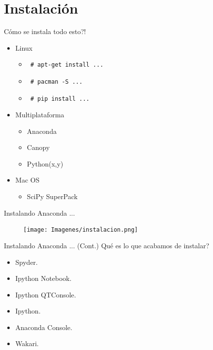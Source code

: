 \documentclass[bigger]{beamer}
\begin{document}
\section{Instalación}
\begin{frame}[fragile]{Cómo se instala todo esto?!}
    \begin{itemize}
        \item Linux
        \begin{itemize}
            \item \begin{verbatim} # apt-get install ... \end{verbatim}
            \item \begin{verbatim} # pacman -S ... \end{verbatim}
            \item \begin{verbatim} # pip install ...\end{verbatim}
        \end{itemize}
        \item Multiplataforma
        \begin{itemize}
            \item Anaconda
            \item Canopy
            \item Python(x,y)
        \end{itemize}
        \item Mac OS
        \begin{itemize}
            \item SciPy SuperPack
        \end{itemize}
    \end{itemize}
\end{frame}
\begin{frame}[fragile]{Instalando Anaconda ...}
     \begin{figure}[h]
        \texttt{[image: Imagenes/instalacion.png]}
\end{figure}
\end{frame}
\begin{frame}{Instalando Anaconda ... (Cont.)}
Qué es lo que acabamos de instalar?
\begin{itemize}
    \item Spyder.
    \item Ipython Notebook.
    \item Ipython QTConsole.
    \item Ipython.
    \item Anaconda Console.
    \item Wakari.
\end{itemize}
\end{frame}
\end{document}
